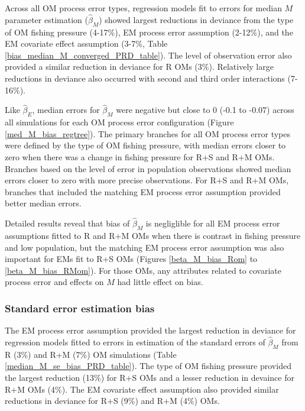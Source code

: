 \documentclass[
  12pt,
]{article}
\begin{document}
Across all OM process error types, regression models fit to errors for median \(M\) parameter estimation (\(\widehat \beta_M\)) showed largest reductions in deviance from the type of OM fishing pressure (4-17\%), EM process error assumption (2-12\%), and the EM covariate effect assumption (3-7\%, Table \ref{bias_median_M_converged_PRD_table}). The level of observation error also provided a similar reduction in deviance for R OMs (3\%). Relatively large reductions in deviance also occurred with second and third order interactions (7-16\%).

Like \(\widehat \beta_E\), median errors for \(\widehat \beta_M\) were negative but close to 0 (-0.1 to -0.07) across all simulations for each OM process error configuration (Figure \ref{med_M_bias_regtree}). The primary branches for all OM process error types were defined by the type of OM fishing pressure, with median errors closer to zero when there was a change in fishing pressure for R+S and R+M OMs. Branches based on the level of error in population observations showed median errors closer to zero with more precise observations. For R+S and R+M OMs, branches that included the matching EM process error assumption provided better median errors.

Detailed results reveal that bias of \(\widehat \beta_M\) is negliglible for all EM process error assumptions fitted to R and R+M OMs when there is contrast in fishing pressure and low population, but the matching EM process error assumption was also important for EMs fit to R+S OMs (Figures \ref{beta_M_bias_Rom} to \ref{beta_M_bias_RMom}). For those OMs, any attributes related to covariate process error and effects on \(M\) had little effect on bias.

\subsubsection*{Standard error estimation bias}\label{standard-error-estimation-bias-1}

The EM process error assumption provided the largest reduction in deviance for regression models fitted to errors in estimation of the standard errors of \(\widehat \beta_M\) from R (3\%) and R+M (7\%) OM simulations (Table \ref{median_M_se_bias_PRD_table}). The type of OM fishing pressure provided the largest reduction (13\%) for R+S OMs and a lesser reduction in devaince for R+M OMs (4\%). The EM covariate effect assumption also provided similar reductions in deviance for R+S (9\%) and R+M (4\%) OMs.
\end{document}
